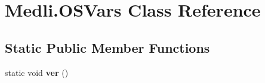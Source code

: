 \hypertarget{class_medli_1_1_o_s_vars}{}\section{Medli.\+O\+S\+Vars Class Reference}
\label{class_medli_1_1_o_s_vars}
\subsection*{Static Public Member Functions}
\begin{DoxyCompactItemize}
\item 
\mbox{\label{class_medli_1_1_o_s_vars_aa19e37c47f1042900b3f8ac4366b296f}} 
static void {\bfseries ver} ()
\end{DoxyCompactItemize}
